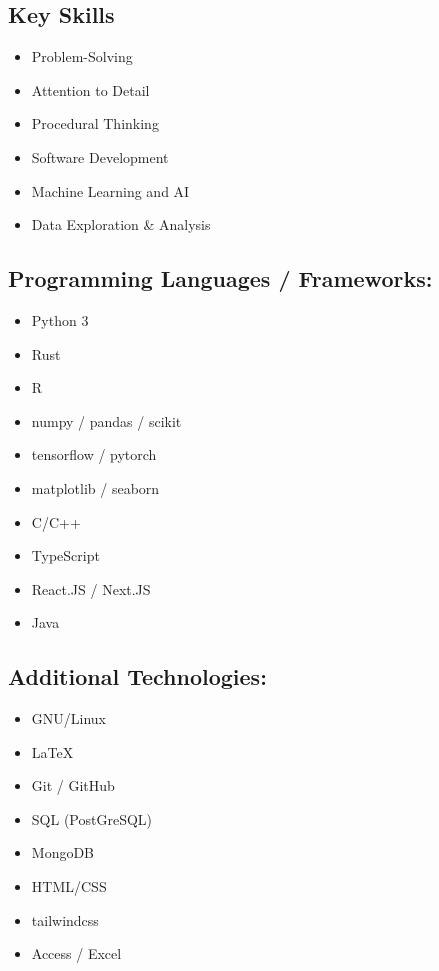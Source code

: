 \documentclass[9pt]{extarticle}
\begin{document}
\begin{minipage}{0.3\textwidth}
	\raggedright
	\begin{tcolorbox}[colback=grey]

		\section{Key Skills}

		\begin{itemize}[leftmargin=*]
			\item Problem-Solving
			\item Attention to Detail
			\item Procedural Thinking
			\item Software Development
			\item Machine Learning and AI
			\item Data Exploration \& Analysis

		\end{itemize}

		\subsection{Programming Languages / Frameworks:}
		\begin{itemize}[leftmargin=*]

			\item Python 3
			\item Rust
			\item R
			\item numpy / pandas / scikit
			\item tensorflow / pytorch
			\item matplotlib / seaborn
			\item C/C++
			\item TypeScript
			\item React.JS / Next.JS
			\item Java

		\end{itemize}

		\subsection{Additional Technologies:}
		\begin{itemize}[leftmargin=*]
			\item GNU/Linux
			\item LaTeX
			\item Git / GitHub
			\item SQL (PostGreSQL)
			\item MongoDB
			\item HTML/CSS
			\item tailwindcss
			\item Access / Excel
		\end{itemize}


\end{tcolorbox}
\end{minipage}
\end{document}
